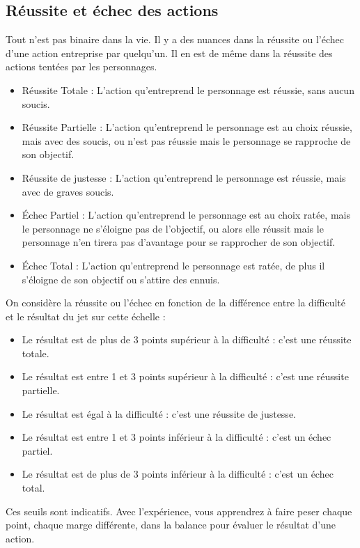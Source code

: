 \subsection{Réussite et échec des actions}

Tout n'est pas binaire dans la vie. Il y a des nuances dans la réussite ou l'échec d'une action entreprise par quelqu'un. Il en est de même dans la réussite des actions tentées par les personnages. 

\begin{itemize}
\item Réussite Totale : L'action qu'entreprend le personnage est réussie, sans aucun soucis.
\item Réussite Partielle : L'action qu'entreprend le personnage est au choix réussie, mais avec des soucis, ou n'est pas réussie mais le personnage se rapproche de son objectif.
\item Réussite de justesse : L'action qu'entreprend le personnage est réussie, mais avec de graves soucis.
\item Échec Partiel : L'action qu'entreprend le personnage est au choix ratée, mais le personnage ne s'éloigne pas de l'objectif, ou alors elle réussit mais le personnage n'en tirera pas d'avantage pour se rapprocher de son objectif.
\item Échec Total : L'action qu'entreprend le personnage est ratée, de plus il s'éloigne de son objectif ou s'attire des ennuis.
\end{itemize}

On considère la réussite ou l'échec en fonction de la différence entre la difficulté et le résultat du jet sur cette échelle :

\begin{itemize}
\item Le résultat est de plus de 3 points supérieur à la difficulté : c'est une réussite totale.
\item Le résultat est entre 1 et 3 points supérieur à la difficulté : c'est une réussite partielle.
\item Le résultat est égal à la difficulté : c'est une réussite de justesse.
\item Le résultat est entre 1 et 3 points inférieur à la difficulté : c'est un échec partiel.
\item Le résultat est de plus de 3 points inférieur à la difficulté : c'est un échec total.
\end{itemize}

Ces seuils sont indicatifs. Avec l'expérience, vous apprendrez à faire peser chaque point, chaque marge différente, dans la balance pour évaluer le résultat d'une action.

